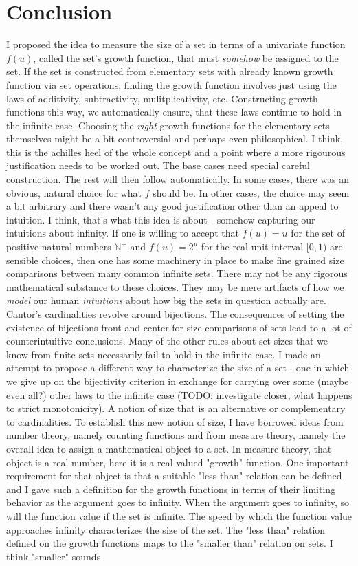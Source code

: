 \documentclass[12pt]{article}
\begin{document}
\section{Conclusion}
I proposed the idea to measure the size of a set in terms of a univariate function $f(u)$, called the set's growth function, that must \emph{somehow} be assigned to the set. If the set is constructed from elementary sets with already known growth function via set operations, finding the growth function involves just using the laws of additivity, subtractivity, mulitplicativity, etc. Constructing growth functions this way, we automatically ensure, that these laws continue to hold in the infinite case. Choosing the \emph{right} growth functions for the elementary sets themselves might be a bit controversial and perhaps even philosophical. I think, this is the achilles heel of the whole concept and a point where a more rigourous justification needs to be worked out. The base cases need special careful construction. The rest will then follow automatically. In some cases, there was an obvious, natural choice for what $f$ should be. In other cases, the choice may seem a bit arbitrary and there wasn't any good justification other than an appeal to intuition. I think, that's what this idea is about - somehow capturing our intuitions about infinity. If one is willing to accept that $f(u) = u$ for the set of positive natural numbers $\mathbb{N}^+$ and $f(u) = 2^u$ for the real unit interval $[0,1)$ are sensible choices, then one has some machinery in place to make fine grained size comparisons between many common infinite sets. There may not be any rigorous mathematical substance to these choices. They may be mere artifacts of how we \emph{model} our human \emph{intuitions} about how big the sets in question actually are. Cantor's cardinalities revolve around bijections. The consequences of setting the existence of bijections front and center for size comparisons of sets lead to a lot of counterintuitive conclusions. Many of the other rules about set sizes that we know from finite sets necessarily fail to hold in the infinite case. I made an attempt to propose a different way to characterize the size of a set - one in which we give up on the bijectivity criterion in exchange for carrying over some (maybe even all?) other laws to the infinite case (TODO: investigate closer, what happens to strict monotonicity). A notion of size that is an alternative or complementary to cardinalities. To establish this new notion of size, I have borrowed ideas from number theory, namely counting functions and from measure theory, namely the overall idea to assign a mathematical object to a set. In measure theory, that object is a real number, here it is a real valued "growth" function. One important requirement for that object is that a suitable "less than" relation can be defined and I gave such a definition for the growth functions in terms of their limiting behavior as the argument goes to infinity. When the argument goes to infinity, so will the function value if the set is infinite. The speed by which the function value approaches infinity characterizes the size of the set. The "less than" relation defined on the growth functions maps to the "smaller than" relation on sets. I think "smaller" sounds 
\end{document}

